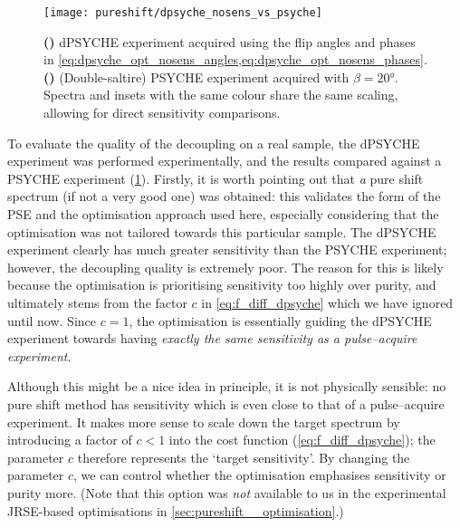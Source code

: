 \begin{figure}[htb]
    \centering
    \texttt{[image: pureshift/dpsyche\_nosens\_vs\_psyche]}%
    {\label{fig:dpsyche_nosens_vs_psyche_dp}}%
    {\label{fig:dpsyche_nosens_vs_psyche_p}}%
    \caption[Comparison of optimised dPSYCHE and PSYCHE]{
        \textbf{()} dPSYCHE experiment acquired using the flip angles and phases in \cref{eq:dpsyche_opt_nosens_angles,eq:dpsyche_opt_nosens_phases}.
        \textbf{()} (Double-saltire) PSYCHE experiment acquired with $\beta = \ang{20}$.
        Spectra and insets with the same colour share the same scaling, allowing for direct sensitivity comparisons.
    }
    \label{fig:dpsyche_nosens_vs_psyche}
\end{figure}

To evaluate the quality of the decoupling on a real sample, the dPSYCHE experiment was performed experimentally, and the results compared against a PSYCHE experiment (\cref{fig:dpsyche_nosens_vs_psyche}).
Firstly, it is worth pointing out that \textit{a} pure shift spectrum (if not a very good one) was obtained: this validates the form of the PSE and the optimisation approach used here, especially considering that the optimisation was not tailored towards this particular sample.
The dPSYCHE experiment clearly has much greater sensitivity than the PSYCHE experiment; however, the decoupling quality is extremely poor.
The reason for this is likely because the optimisation is prioritising sensitivity too highly over purity, and ultimately stems from the factor $c$ in \cref{eq:f_diff_dpsyche} which we have ignored until now.
Since $c = 1$, the optimisation is essentially guiding the dPSYCHE experiment towards having \textit{exactly the same sensitivity as a pulse--acquire experiment}.

Although this might be a nice idea in principle, it is not physically sensible: no pure shift method has sensitivity which is even close to that of a pulse--acquire experiment.
It makes more sense to scale down the target spectrum by introducing a factor of $c < 1$ into the cost function (\cref{eq:f_diff_dpsyche}); the parameter $c$ therefore represents the `target sensitivity'.
By changing the parameter $c$, we can control whether the optimisation emphasises sensitivity or purity more.
(Note that this option was \textit{not} available to us in the experimental JRSE-based optimisations in \cref{sec:pureshift__optimisation}.)

